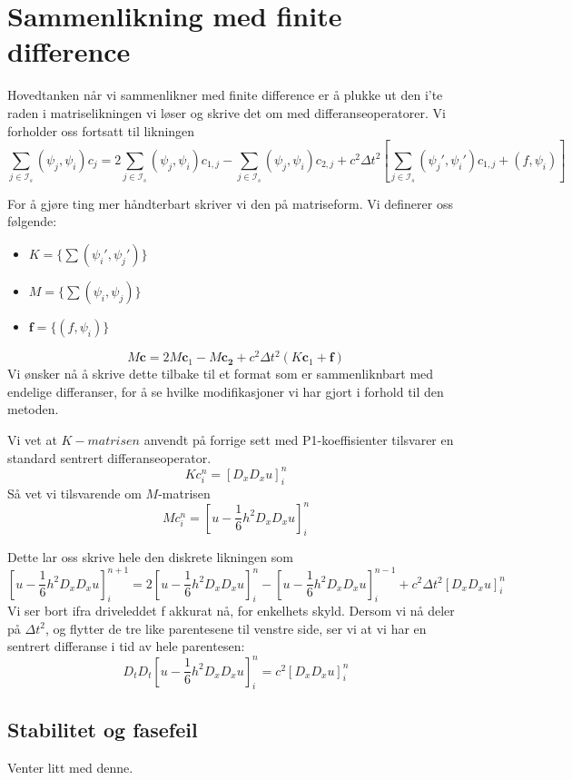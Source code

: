 \documentclass[a4paper, 10pt]{article}
\newcommand{\mb}{\mathbf}
\newcommand{\mc}{\mathcal}
\begin{document}
\section{Sammenlikning med finite difference}
Hovedtanken når vi sammenlikner med finite difference er å plukke ut den i'te raden i matriselikningen vi løser og skrive det om med differanseoperatorer. 
Vi forholder oss fortsatt til likningen
\begin{equation}
	\sum_{j \in \mc{I}_s } (\psi_j, \psi_i)c_j = 2\sum_{j \in \mc{I}_s }(\psi_j, \psi_i)c_{1, j} - \sum_{j \in \mc{I}_s }(\psi_j, \psi_i)c_{2, j} + c^2\Delta t^2 \left[\sum_{j \in \mc{I}_s } (\psi_j', \psi_i')c_{1, j} + (f, \psi_i)\right]
\end{equation}

For å gjøre ting mer håndterbart skriver vi den på matriseform.
Vi definerer oss følgende:
\begin{itemize}
\item $K = \{\sum (\psi_i', \psi_j')\}$
\item $M = \{\sum (\psi_i, \psi_j)\}$
\item $\mb{f} = \{(f, \psi_i)\}$
\end{itemize}

\begin{equation}
	M\mb{c} = 2M\mb{c}_1 - M\mb{c_2} + c^2\Delta t^2 (K\mb{c}_1 + \mb{f})
\end{equation}
Vi ønsker nå å skrive dette tilbake til et format som er sammenliknbart med endelige differanser, for å se hvilke modifikasjoner vi har gjort i forhold til den metoden.

Vi vet at $K-matrisen$ anvendt på forrige sett med P1-koeffisienter tilsvarer en standard sentrert differanseoperator.
\begin{equation}
Kc_i^n = [D_x D_x u]_i^n
\end{equation}
Så vet vi tilsvarende om $M$-matrisen
\begin{equation}
	Mc_i^n = [u-\frac{1}{6}h^2 D_x D_x u]_i^n
\end{equation}

Dette lar oss skrive hele den diskrete likningen som
\begin{equation}
	\left[u-\frac{1}{6} h^2 D_xD_x u\right]_i^{n+1} = 2\left[u-\frac{1}{6} h^2 D_xD_x u\right]_i^n - \left[u-\frac{1}{6} h^2 D_xD_x u\right]_i^{n-1} + c^2 \Delta t^2 \left[D_xD_xu\right]_i^n
\end{equation}
Vi ser bort ifra driveleddet f akkurat nå, for enkelhets skyld. Dersom vi nå deler på $\Delta t^2$, og flytter de tre like parentesene til venstre side, ser vi at vi har en sentrert differanse i tid av hele parentesen:
\begin{equation}
	D_tD_t\left[u-\frac{1}{6} h^2 D_xD_x u\right]_i^n = c^2[D_xD_xu]_i^n
\end{equation}

\subsection{Stabilitet og fasefeil}
Venter litt med denne. 
\end{document}
